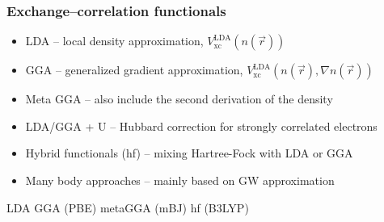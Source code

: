 \documentclass[noamsthm,8pt,t,xcolor={dvipsnames}]{beamer}
\begin{document}
\begin{frame}
   \frametitle{Exchange--correlation functionals}
   \begin{itemize}
      \item LDA -- local density approximation, $V_\mathrm{xc}^\mathrm{LDA}(n(\vec{r}))$
      \item GGA -- generalized gradient approximation, $V_\mathrm{xc}^\mathrm{LDA}(n(\vec{r}), \nabla n(\vec{r}))$
      \item Meta GGA -- also include the second derivation of the density
      \item LDA/GGA + U -- Hubbard correction for strongly correlated electrons
      \item Hybrid functionals (hf) -- mixing Hartree-Fock with LDA or GGA
      \item Many body approaches -- mainly based on GW approximation 
   \end{itemize}
   
   \pause
   \hspace{1.1cm} LDA \hspace{1.6cm} GGA (PBE) \hspace{1cm} metaGGA (mBJ) \hspace{1cm} hf (B3LYP)


\end{frame}
\end{document}
